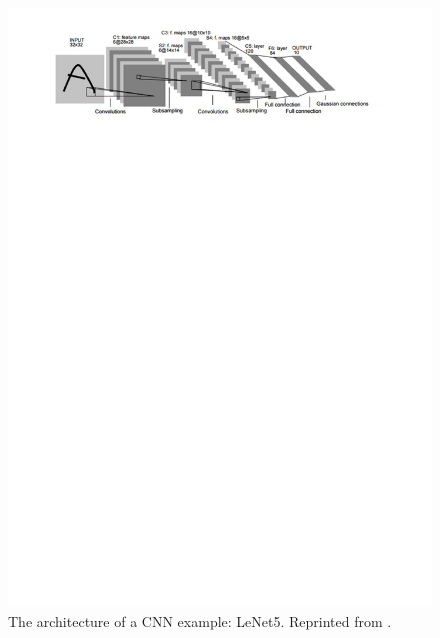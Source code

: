 \begin{figure}
	\includegraphics[trim=2cm 23cm 0cm 1cm]{figs/cnn.pdf}
	\caption{The architecture of a CNN example: LeNet5. Reprinted from \cite{cnn}.}
	\label{fig:cnn}
\end{figure}

